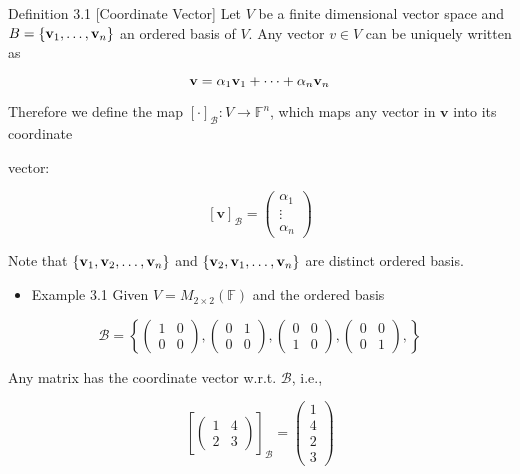 \documentclass[11pt]{article}
\begin{document}
Definition 3.1 [Coordinate Vector] Let \(V\) be a finite dimensional vector space and \(B = \left\{  {{\bf v}_1,\ldots ,{\bf v}_n}\right\}\) an ordered basis of \(V\). Any vector \(v \in  V\) can be uniquely written as

\[
\mathbf{v} = \alpha_1{\bf v}_1 + \cdots  + \alpha_n{\bf v}_n
\]

Therefore we define the map \({\left\lbrack  \cdot \right\rbrack  }_{\mathcal{B}} : V \rightarrow  {\mathbb{F}}^n\), which maps any vector in \(\mathbf{v}\) into its coordinate

vector:

\[
{\left\lbrack  \mathbf{v}\right\rbrack  }_{\mathcal{B}} = \left( \begin{matrix} \alpha_1 \\  \vdots \\  \alpha_n \end{matrix}\right)
\]

Note that \(\left\{  {{\bf v}_1,{\bf v}_2,\ldots ,{\bf v}_n}\right\}\) and \(\left\{  {{\bf v}_2,{\bf v}_1,\ldots ,{\bf v}_n}\right\}\) are distinct ordered basis.

\begin{itemize}
\item Example 3.1 Given \(V = {M}_{2 \times  2}\left( \mathbb{F}\right)\) and the ordered basis
\end{itemize}

\[
\mathcal{B} = \left\{  {\left( \begin{array}{ll} 1 & 0 \\  0 & 0 \end{array}\right) ,\left( \begin{array}{ll} 0 & 1 \\  0 & 0 \end{array}\right) ,\left( \begin{array}{ll} 0 & 0 \\  1 & 0 \end{array}\right) ,\left( \begin{array}{ll} 0 & 0 \\  0 & 1 \end{array}\right) ,}\right\}
\]

Any matrix has the coordinate vector w.r.t. \(\mathcal{B}\), i.e.,

\[
{\left\lbrack  \left( \begin{array}{ll} 1 & 4 \\  2 & 3 \end{array}\right) \right\rbrack  }_{\mathcal{B}} = \left( \begin{array}{l} 1 \\  4 \\  2 \\  3 \end{array}\right)
\]
\end{document}

